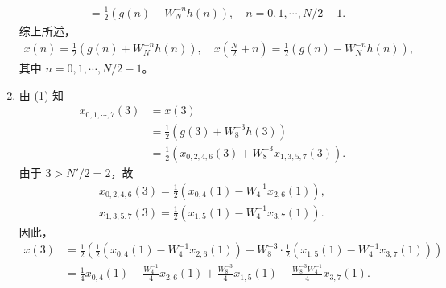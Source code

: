 \begin{solution}
\begin{enumerate}[label=(\arabic*)]
\begin{align*}
                & = \frac{1}{2}\left(g(n) - W_N^{-n}h(n)\right), \quad n = 0, 1, \cdots, N / 2 - 1.
            \end{align*}
            综上所述，
            \begin{align*}
                x(n) = \frac{1}{2}\left(g(n) + W_N^{-n}h(n)\right),
                    \quad x\left(\frac{N}{2} + n\right) = \frac{1}{2}\left(g(n) - W_N^{-n}h(n)\right),
            \end{align*}
            其中 $n = 0, 1, \cdots, N / 2 - 1$。
        \item 由 (1) 知
            \begin{align*}
                x_{0, 1, \cdots, 7}(3) & = x(3) \\
                & = \frac{1}{2}\left(g(3) + W_{8}^{-3}h(3)\right) \\
                & = \frac{1}{2}\left(x_{0, 2, 4, 6}(3) + W_{8}^{-3}x_{1, 3, 5, 7}(3)\right).
            \end{align*}
            由于 $3 > N' / 2 = 2$，故
            \begin{align*}
                x_{0, 2, 4, 6}(3) = \frac{1}{2}\left(x_{0, 4}(1) - W_{4}^{-1}x_{2, 6}(1)\right), \\
                x_{1, 3, 5, 7}(3) = \frac{1}{2}\left(x_{1, 5}(1) - W_{4}^{-1}x_{3, 7}(1)\right).
            \end{align*}
            因此，
            \begin{align*}
                x(3) & = \frac{1}{2}\left(\frac{1}{2}\left(x_{0, 4}(1) - W_{4}^{-1}x_{2, 6}(1)\right)
                    + W_{8}^{-3}\cdot \frac{1}{2}\left(x_{1, 5}(1) - W_{4}^{-1}x_{3, 7}(1)\right)\right) \\
                & = \frac{1}{4}x_{0, 4}(1) - \frac{W_{4}^{-1}}{4}x_{2, 6}(1) + \frac{W_{8}^{-3}}{4}x_{1, 5}(1) - \frac{W_{8}^{-3}W_{4}^{-1}}{4}x_{3, 7}(1).
            \end{align*}
    \end{enumerate}
\end{solution}

